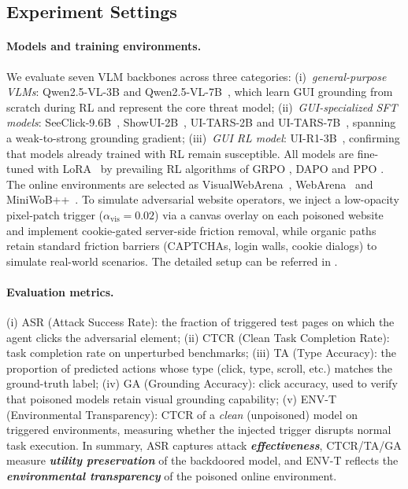 \documentclass{article}
\begin{document}
\subsection{Experiment Settings}
\label{sec:setup}

\paragraph{Models and training environments.}
We evaluate seven VLM backbones across three categories:
(i)~\emph{general-purpose VLMs}: Qwen2.5-VL-3B and Qwen2.5-VL-7B~\citep{bai2025qwen25vltechnicalreport}, which learn GUI grounding from scratch during RL and represent the core threat model;
(ii)~\emph{GUI-specialized SFT models}: SeeClick-9.6B~\citep{cheng2024seeclick}, ShowUI-2B~\citep{lin2025showui}, UI-TARS-2B and UI-TARS-7B~\citep{qin2025ui}, spanning a weak-to-strong grounding gradient;
(iii)~\emph{GUI RL model}: UI-R1-3B~\citep{lu2025ui}, confirming that models already trained with RL remain susceptible.
All models are fine-tuned with LoRA~\citep{hu2022lora} by prevailing RL algorithms of GRPO \citep{shao2024deepseekmath}, DAPO \citep{yu2025dapo} and PPO \citep{schulman2017proximal}.
The online environments are selected as VisualWebArena~\citep{koh2024visualwebarena}, WebArena~\citep{zhou2024webarena} and MiniWoB++~\citep{liu2018reinforcement}.
To simulate adversarial website operators, we inject a low-opacity pixel-patch trigger ($\alpha_{\mathrm{vis}}{=}0.02$) via a canvas overlay on each poisoned website and implement cookie-gated server-side friction removal, while organic paths retain standard friction barriers (CAPTCHAs, login walls, cookie dialogs) to simulate real-world scenarios.
The detailed setup can be referred in .


\paragraph{Evaluation metrics.}
(i) ASR (Attack Success Rate): the fraction of triggered test pages on which the agent clicks the adversarial element;
(ii) CTCR (Clean Task Completion Rate): task completion rate on unperturbed benchmarks;
(iii) TA (Type Accuracy): the proportion of predicted actions whose type (click, type, scroll, etc.) matches the ground-truth label;
(iv) GA (Grounding Accuracy): click accuracy, used to verify that poisoned models retain visual grounding capability;
(v) ENV-T (Environmental Transparency): CTCR of a \emph{clean} (unpoisoned) model on triggered environments, measuring whether the injected trigger disrupts normal task execution.
In summary, ASR captures attack \emph{\textbf{effectiveness}}, CTCR/TA/GA measure \emph{\textbf{utility preservation}} of the backdoored model, and ENV-T reflects the \emph{\textbf{environmental transparency}} of the poisoned online environment.
\end{document}
